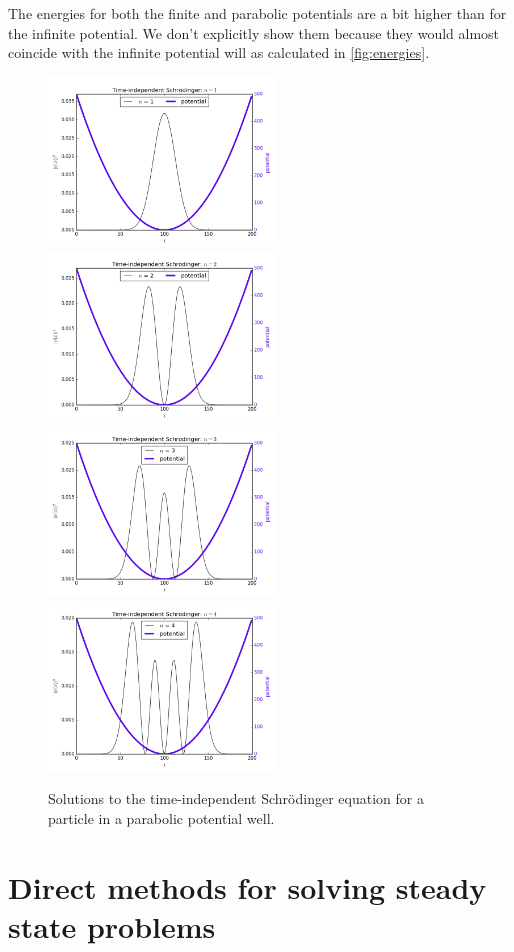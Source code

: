 \documentclass[a4paper]{article}
\begin{document}
The energies for both the finite and parabolic potentials are a bit higher than for the infinite potential. We don't explicitly show them because they would almost coincide with the infinite potential will as calculated in \ref{fig:energies}.

\begin{figure}
\centering
\includegraphics[width=6cm]{parabolic_1}
\includegraphics[width=6cm]{parabolic_2}
\includegraphics[width=6cm]{parabolic_3}
\includegraphics[width=6cm]{parabolic_4}
\caption{Solutions to the time-independent Schr\"odinger equation for a particle in a parabolic potential well.}
\label{fig:parabolic}
\end{figure}

\section{Direct methods for solving steady state problems}
\end{document}
